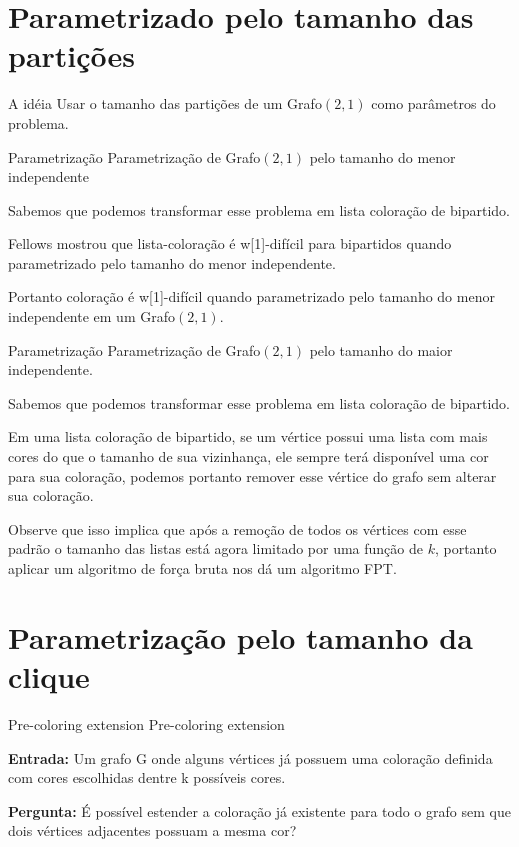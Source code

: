 \documentclass[9pt, compress]{beamer}
\begin{document}
    \section{Parametrizado pelo tamanho das partições}
    \begin{frame}{A idéia}
          Usar o tamanho das partições de um Grafo$(2,1)$ como parâmetros do problema.
    \end{frame}
    \begin{frame}{Parametrização}
      \large{Parametrização de Grafo$(2,1)$ pelo tamanho do menor independente}
      \normalsize\newline\newline
            
      Sabemos que podemos transformar esse problema em lista coloração de bipartido.
      
      Fellows mostrou que lista-coloração é w[1]-difícil para bipartidos quando parametrizado pelo tamanho do menor independente.
      
      Portanto coloração é w[1]-difícil quando parametrizado pelo tamanho do menor independente em um Grafo$(2,1)$.
    \end{frame}
    \begin{frame}{Parametrização}
    \large{Parametrização de Grafo$(2,1)$ pelo tamanho do maior independente.}
      \normalsize\newline\newline
            
      Sabemos que podemos transformar esse problema em lista coloração de bipartido.
      
      Em uma lista coloração de bipartido, se um vértice possui uma lista com mais cores do que o tamanho de sua vizinhança, ele sempre terá disponível uma cor para sua coloração, podemos portanto remover esse vértice do grafo sem alterar sua coloração.
      
      Observe que isso implica que após a remoção de todos os vértices com esse padrão o tamanho das listas está agora limitado por uma função de $k$, portanto aplicar um algoritmo de força bruta nos dá um algoritmo FPT.
     \end{frame}
     
    \section{Parametrização pelo tamanho da clique}
     \begin{frame}{Pre-coloring extension}
      \large{Pre-coloring extension}
      \normalsize\newline\newline
      
	      \textbf{Entrada:}  Um grafo G onde alguns vértices já possuem uma coloração definida com cores escolhidas dentre k possíveis cores.
	      
	      \textbf{Pergunta:}  É possível estender a coloração já existente para todo o grafo sem que dois vértices adjacentes possuam a mesma cor?
     \end{frame}
     
\end{document}

